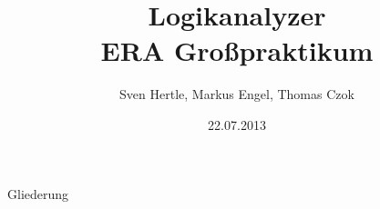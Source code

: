 

\title[ERA GP Logikanalyzer]{Logikanalyzer\\\normalsize ERA Großpraktikum}
\author[]{Sven Hertle, Markus Engel, Thomas Czok}
\date{22.07.2013}


\begin{frame}{}
    \titlepage
\end{frame}

\begin{frame}{Gliederung}
    \tableofcontents
\end{frame}







\addtocounter{framenumber}{-1}
\frame[plain]{}


